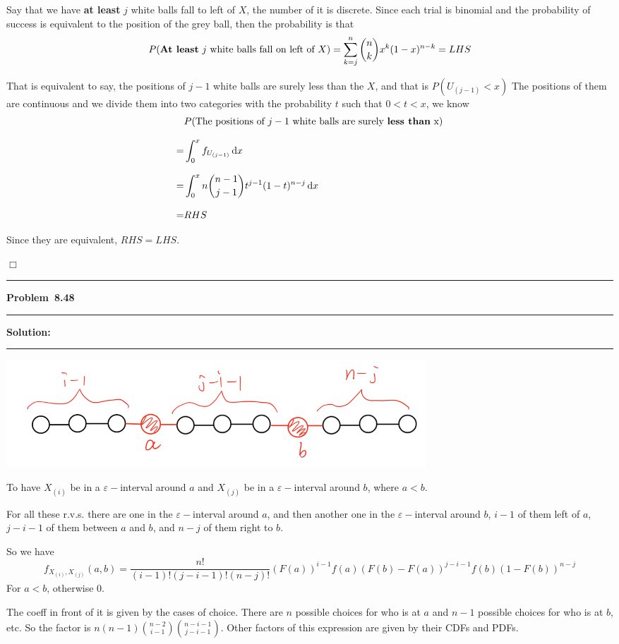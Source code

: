 \documentclass[10.5pt]{article}
\newcommand\question[1]{\vspace{.2in}\hrule\vspace{0.04in}\textbf{Problem\ #1}\vspace{.4em}\hrule\vspace{.10in}}
\newcommand\Solution{\vspace{.3in}\textbf{Solution:}\vspace{.5em}\hrule\vspace{.08in}\par}
\begin{document}
Say that we have \textbf{at least} $j$ white balls fall to left of $X$, the number of it is discrete. Since each trial is binomial and the probability of success is equivalent to the position of the grey ball, then the probability is that $$P(\text{\textbf{At least} $j$ white balls fall on left of $X$})=\displaystyle{\sum_{k = j}^n\binom{n}{k}x^k(1-x)^{n - k}}=LHS$$


\vspace{0.4cm}
That is equivalent to say, the positions of $j-1$ white balls are surely less than the $X$, and that is $P(U_{(j-1)} < x)$ The positions of them are continuous and we divide them into two categories with the probability $t$ such that $0<t<x$, we know \begin{align*}
	&P(\text{The positions of $j-1$ white balls are surely \textbf{less than} x})\\[8pt] 
	=& \int_0^xf_{U_{(j-1)}}\,\mathrm{d}x\\[8pt]
	=& \int_0^xn\binom{n-1}{j-1}t^{j-1}(1-t)^{n-j}\,\mathrm{d}x\\[8pt]
	=&RHS
\end{align*}


\vspace{0.4cm}
Since they are equivalent, $RHS = LHS$.

\vspace{0.4cm}
$\Box$




\pagebreak
\question{8.48}
\Solution{}
\includegraphics[width=6.2in, keepaspectratio]{1.jpeg}

To have $X_{(i)}$ be in a $\varepsilon-$interval around $a$ and  $X_{(j)}$ be in a $\varepsilon-$interval around $b$, where $a<b$.

For all these r.v.s. there are one in the $\varepsilon-$interval around $a$, and then another one in the  $\varepsilon-$interval around $b$, $i-1$ of them left of $a$, $j-i-1$ of them between $a$ and $b$, and $n - j$ of them right to $b$.

So we have$$f_{X_{(i)}, X_{(j)}}(a, b) = \frac{n!}{(i-1)!(j-i-1)!(n-j)!}(F(a))^{i-1}f(a)(F(b)-F(a))^{j-i-1}f(b)(1-F(b))^{n-j}$$
For $a<b$, otherwise $0$.

\vspace{0.4cm}
The coeff in front of it is given by the cases of choice. There are $n$ possible choices for who is at $a$ and $n-1$ possible choices for who is at $b$, etc. So the factor is $n(n-1)\binom{n-2}{i-1}\binom{n-i-1}{j-i-1}$. Other factors of this expression are given by their CDFs and PDFs.
\end{document}
